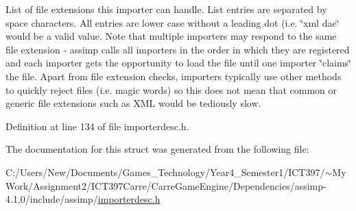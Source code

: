 List of file extensions this importer can handle. List entries are separated by space characters. All entries are lower case without a leading dot (i.e. \char`\"{}xml dae\char`\"{} would be a valid value. Note that multiple importers may respond to the same file extension - assimp calls all importers in the order in which they are registered and each importer gets the opportunity to load the file until one importer \char`\"{}claims\char`\"{} the file. Apart from file extension checks, importers typically use other methods to quickly reject files (i.e. magic words) so this does not mean that common or generic file extensions such as XML would be tediously slow. 

Definition at line 134 of file importerdesc.h.

The documentation for this struct was generated from the following file:\begin{CompactItemize}
\item 
C:/Users/New/Documents/Games\_\-Technology/Year4\_\-Semester1/ICT397/$\sim$My Work/Assignment2/ICT397Carre/CarreGameEngine/Dependencies/assimp-4.1.0/include/assimp/\hyperlink{importerdesc_8h}{importerdesc.h}\end{CompactItemize}
